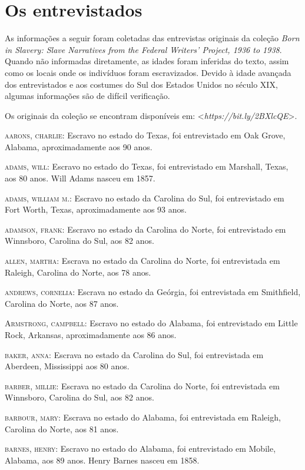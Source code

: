 \chapter{Os entrevistados}

As informações a seguir foram coletadas das entrevistas originais da
coleção \emph{Born in Slavery: Slave Narratives from the Federal
Writers' Project, 1936 to 1938}. Quando não informadas diretamente, as
idades foram inferidas do texto, assim como os locais onde os indivíduos
foram escravizados. Devido à idade avançada dos entrevistados e aos
costumes do Sul dos Estados Unidos no século XIX, algumas informações
são de difícil verificação.

Os originais da coleção se encontram disponíveis em:
\textless{}\emph{https://bit.ly/2BXlcQE}\textgreater{}.

\begin{Parskip}
\textsc{aarons, charlie:} Escravo no estado do Texas, foi entrevistado
em Oak Grove, Alabama, aproximadamente aos 90 anos.

\textsc{adams, will:} Escravo no estado do Texas, foi entrevistado em
Marshall, Texas, aos 80 anos. Will Adams nasceu em 1857.

\textsc{adams, william m.:} Escravo no estado da Carolina do Sul, foi
entrevistado em Fort Worth, Texas, aproximadamente aos 93 anos.

\textsc{adamson, frank:} Escravo no estado da Carolina do Norte, foi
entrevistado em Winnsboro, Carolina do Sul, aos 82 anos.

\textsc{allen, martha:} Escrava no estado da Carolina do Norte, foi
entrevistada em Raleigh, Carolina do Norte, aos 78 anos.

\textsc{andrews, cornelia:} Escrava no estado da Geórgia, foi
entrevistada em Smithfield, Carolina do Norte, aos 87 anos.

\textsc{Armstrong, campbell:} Escravo no estado do Alabama, foi
entrevistado em Little Rock, Arkansas, aproximadamente aos 86 anos.

\textsc{baker, anna:} Escrava no estado da Carolina do Sul, foi
entrevistada em Aberdeen, Mississippi aos 80 anos.

\textsc{barber, millie:} Escrava no estado da Carolina do Norte, foi
entrevistada em Winnsboro, Carolina do Sul, aos 82 anos.

\textsc{barbour, mary:} Escrava no estado do Alabama, foi entrevistada
em Raleigh, Carolina do Norte, aos 81 anos.

\textsc{barnes, henry:} Escravo no estado do Alabama, foi entrevistado
em Mobile, Alabama, aos 89 anos. Henry Barnes nasceu em 1858.


\end{Parskip}
